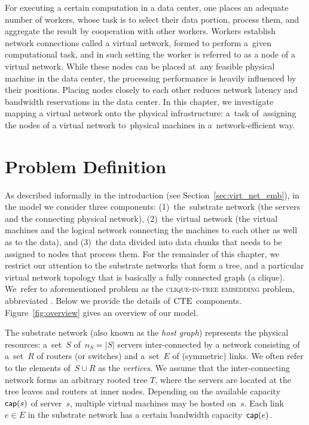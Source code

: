 
For executing a certain computation in a data center, one places an adequate number of workers, whose task is to select their data portion, process them, and aggregate the result by cooperation with other workers.
Workers establish network connections called a virtual network, formed to perform a~given computational task, and in such setting the worker is referred to as a node of a virtual network.
While these nodes can be placed at~any feasible physical machine in the data center, the processing performance is heavily influenced by their positions.
Placing nodes closely to each other reduces network latency and bandwidth reservations in the data center.
In this chapter, we investigate mapping a virtual network onto the physical infrastructure: a~task of~assigning the nodes of a virtual network to~physical machines in a~network-efficient way.

\section{Problem Definition}\label{sec:model}

As described informally in the introduction (see Section~\ref{sec:virt_net_emb}), in the model we consider three components: (1)~the~substrate network (the servers
and the connecting physical network),
(2)~the virtual network (the virtual machines and the logical network connecting the machines to each other
as well as to the data), and (3)~the data divided into data chunks that needs to be assigned to nodes that process them.
For the remainder of this chapter, we restrict our attention to the substrate networks that form a tree, and a particular virtual network topology that is basically a fully connected graph (a clique).
We~refer to aforementioned problem as the \textsc{clique-in-tree embedding} problem, abbreviated \CTE.
Below we provide the details of $\textsc{CTE}$ components. Figure~\ref{fig:overview} gives an overview of our model.


 The substrate network (also known as the \emph{host graph}) represents the physical resources:
a~set~$S$ of~$n_S=|S|$ servers inter-connected by a network consisting of a~set~$R$ of routers (or switches)
and a~set~$E$ of (symmetric) links. We often refer to the elements of~$S\cup R$
as the \emph{vertices}. We assume that the inter-connecting network forms an arbitrary rooted tree $T$,
where the servers are located at the tree leaves and routers at inner nodes.
Depending on the available capacity~$\textsf{cap}(s)$ of server~$s$, multiple virtual machines may be hosted on~$s$.
Each link~$e\in E$ in the substrate network has a certain bandwidth capacity~$\textsf{cap}(e)$.

